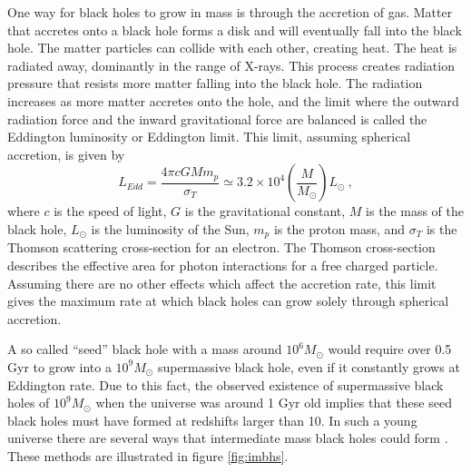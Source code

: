 \documentclass[english, oneside]{HYgradu}
\begin{document}
One way for black holes to grow in mass is through the accretion of gas. Matter that accretes onto a black hole forms a disk and will eventually fall into the black hole. The matter particles can collide with each other, creating heat. The heat is radiated away, dominantly in the range of X-rays. This process creates radiation pressure that resists more matter falling into the black hole. The radiation increases as more matter accretes onto the hole, and the limit where the outward radiation force and the inward gravitational force are balanced is called the Eddington luminosity or Eddington limit. This limit, assuming spherical accretion, is given by
\begin{equation}
L_{Edd} = \frac{4 \pi c G M m_p}{\sigma_T} \simeq 3.2 \times 10^4 \left( \frac{M}{M_\odot} \right) L_\odot \ ,
\end{equation}
where $c$ is the speed of light, $G$ is the gravitational constant, $M$ is the mass of the black hole, $L_\odot$ is the luminosity of the Sun, $m_p$ is the proton mass, and $\sigma_T$ is the Thomson scattering cross-section for an electron. The Thomson cross-section describes the effective area for photon interactions for a free charged particle. Assuming there are no other effects which affect the accretion rate, this limit gives the maximum rate at which black holes can grow solely through spherical accretion. 

A so called ``seed'' black hole with a mass around $10^6 M_\odot$ would require over 0.5 Gyr to grow into a $10^9 M_\odot$ supermassive black hole, even if it constantly grows at Eddington rate. Due to this fact, the observed existence of supermassive black holes of $10^9 M_\odot$ when the universe was around 1 Gyr old implies that these seed black holes must have formed at redshifts larger than 10. In such a young universe there are several ways that intermediate mass black holes could form \citep{mezcua:2017}. These methods are illustrated in figure \ref{fig:imbhs}.
\end{document}
